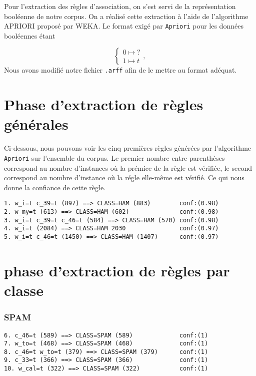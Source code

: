 
Pour l'extraction des règles d'association, on s'est servi de la représentation booléenne de notre corpus. On a réalisé cette extraction à l'aide de l'algorithme APRIORI proposé par WEKA. Le format exigé par \texttt{Apriori} pour les données booléennes étant 

\begin{displaymath}
\begin{cases}
      0 \mapsto ? \\
      1 \mapsto t
\end{cases},
\end{displaymath} 
Nous avons modifié notre fichier \texttt{.arff} afin de le mettre au format adéquat. 



\section{Phase d'extraction de règles générales}

Ci-dessous, nous pouvons voir les cinq premières règles générées par l'algorithme \texttt{Apriori} sur l'ensemble du corpus. Le premier nombre entre parenthèses correspond au nombre d'instances où la prémice de la règle est vérifiée, le second correspond au nombre d'instance où la régle elle-même est vérifié. Ce qui nous donne la confiance de cette règle. 

\begin{verbatim}
1. w_i=t c_39=t (897) ==> CLASS=HAM (883)        conf:(0.98)
2. w_my=t (613) ==> CLASS=HAM (602)              conf:(0.98)
3. w_i=t c_39=t c_46=t (584) ==> CLASS=HAM (570) conf:(0.98)
4. w_i=t (2084) ==> CLASS=HAM 2030               conf:(0.97)
5. w_i=t c_46=t (1450) ==> CLASS=HAM (1407)      conf:(0.97)
\end{verbatim}

\section{phase d'extraction de règles par classe}

\subsubsection{SPAM}

\begin{verbatim}
6. c_46=t (589) ==> CLASS=SPAM (589)             conf:(1)
7. w_to=t (468) ==> CLASS=SPAM (468)             conf:(1)
8. c_46=t w_to=t (379) ==> CLASS=SPAM (379)      conf:(1)
9. c_33=t (366) ==> CLASS=SPAM (366)             conf:(1)
10. w_cal=t (322) ==> CLASS=SPAM (322)           conf:(1)
\end{verbatim}

